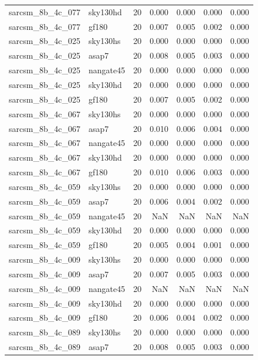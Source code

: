 \begin{tabular}{llrrrrr}
sarcsm\_8b\_4c\_077 & sky130hd & 20 & 0.000 & 0.000 & 0.000 & 0.000 \\
sarcsm\_8b\_4c\_077 & gf180 & 20 & 0.007 & 0.005 & 0.002 & 0.000 \\
sarcsm\_8b\_4c\_025 & sky130hs & 20 & 0.000 & 0.000 & 0.000 & 0.000 \\
sarcsm\_8b\_4c\_025 & asap7 & 20 & 0.008 & 0.005 & 0.003 & 0.000 \\
sarcsm\_8b\_4c\_025 & nangate45 & 20 & 0.000 & 0.000 & 0.000 & 0.000 \\
sarcsm\_8b\_4c\_025 & sky130hd & 20 & 0.000 & 0.000 & 0.000 & 0.000 \\
sarcsm\_8b\_4c\_025 & gf180 & 20 & 0.007 & 0.005 & 0.002 & 0.000 \\
sarcsm\_8b\_4c\_067 & sky130hs & 20 & 0.000 & 0.000 & 0.000 & 0.000 \\
sarcsm\_8b\_4c\_067 & asap7 & 20 & 0.010 & 0.006 & 0.004 & 0.000 \\
sarcsm\_8b\_4c\_067 & nangate45 & 20 & 0.000 & 0.000 & 0.000 & 0.000 \\
sarcsm\_8b\_4c\_067 & sky130hd & 20 & 0.000 & 0.000 & 0.000 & 0.000 \\
sarcsm\_8b\_4c\_067 & gf180 & 20 & 0.010 & 0.006 & 0.003 & 0.000 \\
sarcsm\_8b\_4c\_059 & sky130hs & 20 & 0.000 & 0.000 & 0.000 & 0.000 \\
sarcsm\_8b\_4c\_059 & asap7 & 20 & 0.006 & 0.004 & 0.002 & 0.000 \\
sarcsm\_8b\_4c\_059 & nangate45 & 20 & NaN & NaN & NaN & NaN \\
sarcsm\_8b\_4c\_059 & sky130hd & 20 & 0.000 & 0.000 & 0.000 & 0.000 \\
sarcsm\_8b\_4c\_059 & gf180 & 20 & 0.005 & 0.004 & 0.001 & 0.000 \\
sarcsm\_8b\_4c\_009 & sky130hs & 20 & 0.000 & 0.000 & 0.000 & 0.000 \\
sarcsm\_8b\_4c\_009 & asap7 & 20 & 0.007 & 0.005 & 0.003 & 0.000 \\
sarcsm\_8b\_4c\_009 & nangate45 & 20 & NaN & NaN & NaN & NaN \\
sarcsm\_8b\_4c\_009 & sky130hd & 20 & 0.000 & 0.000 & 0.000 & 0.000 \\
sarcsm\_8b\_4c\_009 & gf180 & 20 & 0.006 & 0.004 & 0.002 & 0.000 \\
sarcsm\_8b\_4c\_089 & sky130hs & 20 & 0.000 & 0.000 & 0.000 & 0.000 \\
sarcsm\_8b\_4c\_089 & asap7 & 20 & 0.008 & 0.005 & 0.003 & 0.000 \\

\end{tabular}
